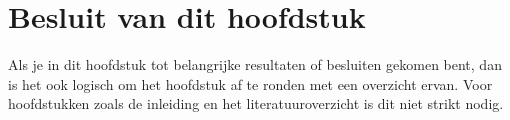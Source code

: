 
\section{Besluit van dit hoofdstuk}
Als je in dit hoofdstuk tot belangrijke resultaten of besluiten gekomen
bent, dan is het ook logisch om het hoofdstuk af te ronden met een
overzicht ervan. Voor hoofdstukken zoals de inleiding en het
literatuuroverzicht is dit niet strikt nodig.

